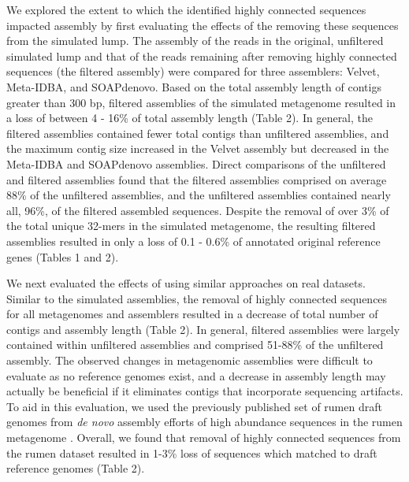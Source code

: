 \documentclass[10pt]{article}
\begin{document}
We explored the extent
to which the identified highly connected
sequences impacted assembly by first evaluating the effects of the
removing these sequences from the simulated lump.  The assembly of the reads in the original,
unfiltered simulated lump and that of the reads remaining after
removing highly connected sequences (the filtered assembly) were
compared for three assemblers: Velvet, Meta-IDBA, and SOAPdenovo.
Based on the total assembly length of contigs greater than 300 bp,
filtered assemblies of the simulated metagenome resulted in a loss of
between 4 - 16\% of total assembly length (Table 2).  In general, the
filtered assemblies contained fewer total contigs than unfiltered
assemblies, and the maximum contig size increased in the Velvet
assembly but decreased in the Meta-IDBA and SOAPdenovo assemblies.
Direct comparisons of the unfiltered and filtered assemblies found
that the filtered assemblies comprised on average 88\% of the
unfiltered assemblies, and the unfiltered assemblies contained nearly
all, 96\%, of the filtered assembled sequences.  Despite the removal
of over 3\% of the total unique 32-mers in the simulated metagenome,
the resulting filtered assemblies resulted in only a loss of 0.1 -
0.6\% of annotated original reference genes (Tables 1 and 2).

We next evaluated the effects of using similar approaches on
real datasets.  Similar to the simulated assemblies, the
removal of highly connected sequences for all metagenomes and
assemblers resulted in a decrease of total number of contigs and assembly
length (Table 2).  In general, filtered assemblies were largely
contained within unfiltered assemblies and comprised 51-88\% of the
unfiltered assembly.  The observed changes in metagenomic assemblies
were difficult to evaluate as no reference genomes exist, 
and a decrease in assembly length may actually be beneficial if it
eliminates contigs that incorporate sequencing artifacts.
To aid in this evaluation, we used the previously published set of
rumen draft genomes from \emph{de novo} assembly efforts of high
abundance sequences in the rumen metagenome \cite{Hess:2011p686}.
Overall, we found that removal of highly connected sequences from the
rumen dataset resulted in 1-3\% loss of sequences which matched to
draft reference genomes (Table 2).
\end{document}
